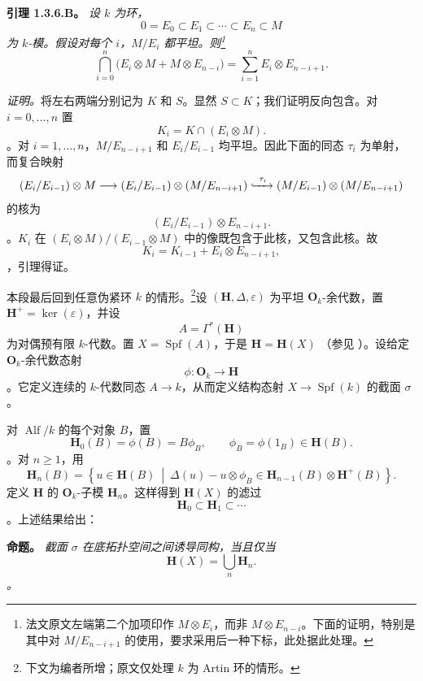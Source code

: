 \medskip\noindent\textbf{引理 1.3.6.B。} \label{sga3:VIIB:1.3.6.B} {\itshape 设 \(k\) 为环，\[
  0=E_0\subset E_1\subset\cdots\subset E_n\subset M
\] 为 \(k\)-模。假设对每个 \(i\)，\(M/E_i\) 都平坦。则\footnote{法文原文左端第二个加项印作 \(M\otimes E_i\)，而非 \(M\otimes E_{n-i}\)。下面的证明，特别是其中对 \(M/E_{n-i+1}\) 的使用，要求采用后一种下标，此处据此处理。}\[
  \bigcap_{i=0}^n
    \bigl(E_i\otimes M+M\otimes E_{n-i}\bigr)
  =
  \sum_{i=1}^n E_i\otimes E_{n-i+1}.
\]}

\textit{证明。}将左右两端分别记为 \(K\) 和 \(S\)。显然 \(S\subset K\)；我们证明反向包含。对 \(i=0,\ldots,n\) 置 \[
  K_i=K\cap(E_i\otimes M).
\]。对 \(i=1,\ldots,n\)，\(M/E_{n-i+1}\) 和 \(E_i/E_{i-1}\) 均平坦。因此下面的同态 \(\tau_i\) 为单射，而复合映射 \[
  (E_i/E_{i-1})\otimes M
  \longrightarrow
  (E_i/E_{i-1})\otimes(M/E_{n-i+1})
  \xhookrightarrow{\ \tau_i\ }
  (M/E_{i-1})\otimes(M/E_{n-i+1})
\] 的核为 \[
  (E_i/E_{i-1})\otimes E_{n-i+1}.
\]。\(K_i\) 在 \((E_i\otimes M)/(E_{i-1}\otimes M)\) 中的像既包含于此核，又包含此核。故 \[
  K_i=K_{i-1}+E_i\otimes E_{n-i+1},
\]，引理得证。

本段最后回到任意伪紧环 \(k\) 的情形。\footnote{\label{sga3:VIIB:nde:66}下文为编者所增；原文仅处理 \(k\) 为 Artin 环的情形。}设 \((\mathbf H,\Delta,\varepsilon)\) 为平坦 \(\mathbf O_k\)-余代数，置 \(\mathbf H^+=\ker(\varepsilon)\)，并设 \[
  A=\Gamma^*(\mathbf H)
\] 为对偶预有限 \(k\)-代数。置 \(X=\operatorname{Spf}(A)\)，于是 \(\mathbf H=\mathbf H(X)\) \textup{（参见 ）}。设给定 \(\mathbf O_k\)-余代数态射 \[
  \phi:\mathbf O_k\longrightarrow\mathbf H
\]。它定义连续的 \(k\)-代数同态 \(A\to k\)，从而定义结构态射 \(X\to\operatorname{Spf}(k)\) 的截面 \(\sigma\)。

对 \(\operatorname{Alf}/k\) 的每个对象 \(B\)，置 \[
  \mathbf H_0(B)=\phi(B)=B\phi_B,
  \qquad
  \phi_B=\phi(1_B)\in\mathbf H(B).
\]。对 \(n\geq1\)，用 \[
  \mathbf H_n(B)
  =
  \left\{
    u\in\mathbf H(B)\ \middle|\
    \Delta(u)-u\otimes\phi_B
    \in
    \mathbf H_{n-1}(B)\otimes\mathbf H^+(B)
  \right\}.
\] 定义 \(\mathbf H\) 的 \(\mathbf O_k\)-子模 \(\mathbf H_n\)。这样得到 \(\mathbf H(X)\) 的滤过 \[
  \mathbf H_0\subset\mathbf H_1\subset\cdots
\]。上述结果给出：

\medskip\noindent\textbf{命题。} \label{sga3:VIIB:1.3.6.proposition} {\itshape 截面 \(\sigma\) 在底拓扑空间之间诱导同构，当且仅当 \[
  \mathbf H(X)=\bigcup_n\mathbf H_n.
\]。}


